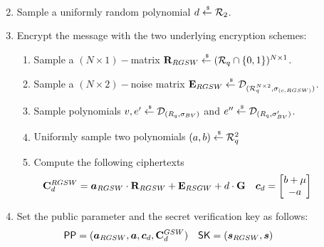 \begin{description}
\begin{enumerate}
\begin{enumerate}
\begin{align*}
        \end{align*}
      \end{enumerate}
    \item Sample a uniformly random polynomial $d \stackrel{{\scriptscriptstyle \mkern4mu \$}}{\gets} {\mathcal{R}}_2$.
    \item Encrypt the message with the two underlying encryption schemes:
      \begin{enumerate}
      \item Sample a $(N \times 1)-$matrix $\mathbf{R}_{RGSW} \stackrel{{\scriptscriptstyle \mkern4mu \$}}{\gets} ({\mathcal{R}}_q \cap\{0,1\})^{N \times 1}$.
      \item Sample a $(N \times 2)-$noise matrix $\mathbf{E}_{RGSW} \stackrel{{\scriptscriptstyle \mkern4mu \$}}{\gets} \mathcal{D}_{({\mathcal{R}}_q^{N \times 2}, \sigma_{(c, RGSW)})}$.
      \item Sample polynomials $v,e' \stackrel{{\scriptscriptstyle \mkern4mu \$}}{\gets} \mathcal{D}_{(R_q, \sigma_{BV})}$ and $e'' \stackrel{{\scriptscriptstyle \mkern4mu \$}}{\gets}  \mathcal{D}_{(R_q, \sigma_{BV}')}$.
      \item Uniformly sample two polynomials $(a, b) \stackrel{{\scriptscriptstyle \mkern4mu \$}}{\gets} {\mathcal{R}}_q^2$
      \item Compute the following ciphertexts
        \begin{align*}
          \mat{C}_d^{RGSW} &= \vec{a}_{RGSW} \cdot \mat{R}_{RGSW} + \mat{E}_{RSGW} +  d \cdot \mat{G} &
          \vec{c}_d &= \begin{bmatrix} b + \mu \\ -a \end{bmatrix}
        \end{align*}
      \end{enumerate}
    \item Set the public parameter and the secret verification key as follows:
      \begin{align*}
        \PPP &= (\vec{a}_{RGSW}, \vec{a}, \vec{c}_d, \mat{C}_d^{GSW}) & \SK &= (\vec{s}_{RGSW}, \vec{s})
      \end{align*}
  \end{enumerate}




\end{description}
